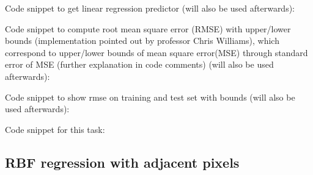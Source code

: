 \documentclass{article}
\begin{document}
\begin{enumerate}[label=(\alph*)]
					Code snippet to get linear regression predictor (will also be used afterwards):
					 
					Code snippet to compute root mean square error (RMSE) with upper/lower bounds (implementation pointed out by professor Chris Williams), which correspond to upper/lower bounds of mean square error(MSE) through standard error of MSE (further explanation in code comments)  (will also be used  afterwards):
					
					Code snippet to show rmse on training and test set with bounds (will also be used  afterwards):
					
					Code snippet for this task:
					
			\end{enumerate}
		\subsection{RBF regression with adjacent pixels}
\end{document}
